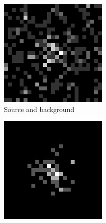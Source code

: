 \documentclass[a4paper,12pt,oneside]{book}
\begin{document}
\begin{onehalfspace}
    \begin{figure}[h!]
	\centering
	\captionsetup[subfigure]{justification=centering}
	\begin{subfigure}{.3\textwidth}
		\centering
		\includegraphics[width=\linewidth]{originalzoom}
		\caption{Source and background}
		\label{fig:originalzoom}
	\end{subfigure}
	\begin{subfigure}{.3\textwidth}
		\centering
		\includegraphics[width=\linewidth]{sourceonly}

\end{subfigure}
\end{figure}
\end{onehalfspace}
\end{document}
